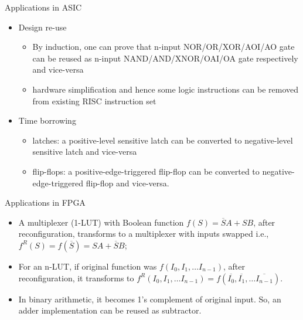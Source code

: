 \begin{frame}{Applications in ASIC}
	\begin{itemize}
		\item Design re-use
			\begin{itemize}
			\item By induction, one can prove that n-input NOR/OR/XOR/AOI/AO gate can be reused as n-input NAND/AND/XNOR/OAI/OA gate respectively and vice-versa
			\item hardware simplification and hence some logic instructions can be removed from existing RISC instruction set
			\end{itemize}
		\item Time borrowing
			\begin{itemize}
				\item latches: a positive-level sensitive latch can be converted to negative-level sensitive latch and vice-versa
				\item flip-flops: a positive-edge-triggered flip-flop can be converted to negative-edge-triggered flip-flop and vice-versa. 
			\end{itemize}
	\end{itemize}
\end{frame}

\begin{frame}{Applications in FPGA}
	\begin{itemize}
		\item A multiplexer (1-LUT) with Boolean function $f(S) = \overline{S}A + SB$, after reconfiguration, transforms to a multiplexer with inputs swapped i.e., $f^R(S) = f(\overline{S}) = SA + \overline{S}B$; 
		\item For an n-LUT, if original function was $f(I_0, I_1, \ldots I_{n-1})$, after reconfiguration, it transforms to $f^R(I_0, I_1, \ldots I_{n-1}) = f(\overline{I_0}, \overline{I_1}, \ldots \overline{I_{n-1}})$.
		\item In binary arithmetic, it becomes 1's complement of original input. So, an adder implementation can be reused as subtractor. 
	\end{itemize}
\end{frame}

